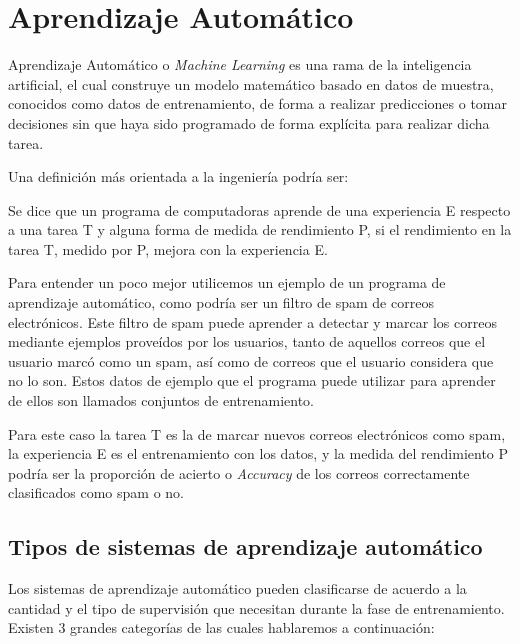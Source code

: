 \chapter{ Aprendizaje Automático }
Aprendizaje Automático o \textit{Machine Learning} es una rama de la inteligencia artificial, el cual construye un modelo matemático basado en datos de muestra, conocidos como datos de entrenamiento, de forma a realizar predicciones o tomar decisiones sin que haya sido programado de forma explícita para realizar dicha tarea.\cite{zhang2020matrix}

Una definición más orientada a la ingeniería podría ser:

Se dice que un programa de computadoras aprende de una experiencia E respecto a una tarea T y alguna forma de medida de rendimiento P, si el rendimiento en la tarea T, medido por P, mejora con la experiencia E.\cite{mitchell1997machine}

Para entender un poco mejor utilicemos un ejemplo de un programa de aprendizaje automático, como podría ser un filtro de spam de correos electrónicos. Este filtro de spam puede aprender a detectar y marcar los correos mediante ejemplos proveídos por los usuarios, tanto de aquellos correos que el usuario marcó como un spam, así como de correos que el usuario considera que no lo son. Estos datos de ejemplo que el programa puede utilizar para aprender de ellos son llamados conjuntos de entrenamiento.

Para este caso la tarea T es la de marcar nuevos correos electrónicos como spam, la experiencia E es el entrenamiento con los datos, y la medida del rendimiento P podría ser la proporción de acierto o \textit{Accuracy} de los correos correctamente clasificados como spam o no.

\section{Tipos de sistemas de aprendizaje automático}
Los sistemas de aprendizaje automático pueden clasificarse de acuerdo a la cantidad y el tipo de supervisión que necesitan durante la fase de entrenamiento. Existen 3 grandes categorías de las cuales hablaremos a continuación:

